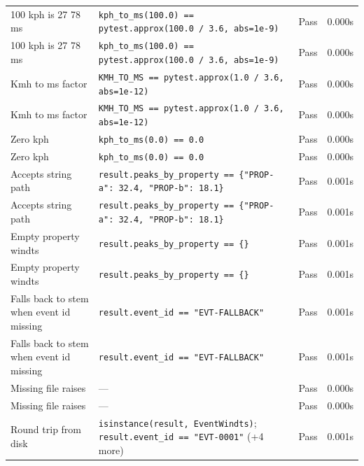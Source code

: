 \documentclass[11pt,a4paper]{article}
\begin{document}
\begin{longtable}{p{6cm}p{5.5cm}cc}
    100 kph is 27 78 ms & {\scriptsize \texttt{kph\_to\_ms(100.0) == pytest.approx(100.0 / 3.6, abs=1e-9)}} & \textcolor{green!60!black}{Pass} & 0.000s \\
    100 kph is 27 78 ms & {\scriptsize \texttt{kph\_to\_ms(100.0) == pytest.approx(100.0 / 3.6, abs=1e-9)}} & \textcolor{green!60!black}{Pass} & 0.000s \\
    Kmh to ms factor & {\scriptsize \texttt{KMH\_TO\_MS == pytest.approx(1.0 / 3.6, abs=1e-12)}} & \textcolor{green!60!black}{Pass} & 0.000s \\
    Kmh to ms factor & {\scriptsize \texttt{KMH\_TO\_MS == pytest.approx(1.0 / 3.6, abs=1e-12)}} & \textcolor{green!60!black}{Pass} & 0.000s \\
    Zero kph & {\scriptsize \texttt{kph\_to\_ms(0.0) == 0.0}} & \textcolor{green!60!black}{Pass} & 0.000s \\
    Zero kph & {\scriptsize \texttt{kph\_to\_ms(0.0) == 0.0}} & \textcolor{green!60!black}{Pass} & 0.000s \\
    Accepts string path & {\scriptsize \texttt{result.peaks\_by\_property == \{"PROP-a": 32.4, "PROP-b": 18.1\}}} & \textcolor{green!60!black}{Pass} & 0.001s \\
    Accepts string path & {\scriptsize \texttt{result.peaks\_by\_property == \{"PROP-a": 32.4, "PROP-b": 18.1\}}} & \textcolor{green!60!black}{Pass} & 0.001s \\
    Empty property windts & {\scriptsize \texttt{result.peaks\_by\_property == \{\}}} & \textcolor{green!60!black}{Pass} & 0.001s \\
    Empty property windts & {\scriptsize \texttt{result.peaks\_by\_property == \{\}}} & \textcolor{green!60!black}{Pass} & 0.001s \\
    Falls back to stem when event id missing & {\scriptsize \texttt{result.event\_id == "EVT-FALLBACK"}} & \textcolor{green!60!black}{Pass} & 0.001s \\
    Falls back to stem when event id missing & {\scriptsize \texttt{result.event\_id == "EVT-FALLBACK"}} & \textcolor{green!60!black}{Pass} & 0.001s \\
    Missing file raises & {\scriptsize ---} & \textcolor{green!60!black}{Pass} & 0.000s \\
    Missing file raises & {\scriptsize ---} & \textcolor{green!60!black}{Pass} & 0.000s \\
    Round trip from disk & {\scriptsize \texttt{isinstance(result, EventWindts)}; \texttt{result.event\_id == "EVT-0001"} (+4 more)} & \textcolor{green!60!black}{Pass} & 0.001s \\

\end{longtable}
\end{document}
